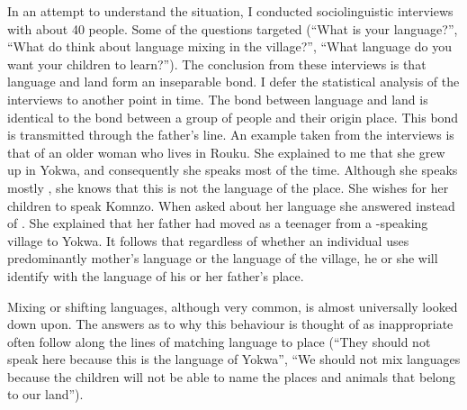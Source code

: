 In an attempt to understand the situation, I conducted sociolinguistic interviews with about 40 people. Some of the questions targeted  (``What is your language?'', ``What do think about language mixing in the village?'', ``What language do you want your children to learn?''). The conclusion from these interviews is that language and land form an inseparable bond. I defer the statistical analysis of the interviews to another point in time. The bond between language and land is identical to the bond between a group of people and their origin place. This bond is transmitted through the father's line. An example taken from the interviews is that of an older woman who lives in Rouku. She explained to me that she grew up in Yokwa, and consequently she speaks  most of the time. Although she speaks mostly , she knows that this is not the language of the place. She wishes for her children to speak Komnzo. When asked about her language she answered  instead of . She explained that her father had moved as a teenager from a -speaking village to Yokwa. It follows that regardless of whether an individual uses predominantly mother's language or the language of the village, he or she will identify with the language of his or her father's place.

Mixing or shifting languages, although very common, is almost universally looked down upon. The answers as to why this behaviour is thought of as inappropriate often follow along the lines of matching language to place (``They should not speak  here because this is the language of Yokwa'', ``We should not mix languages because the children will not be able to name the places and animals that belong to our land'').

